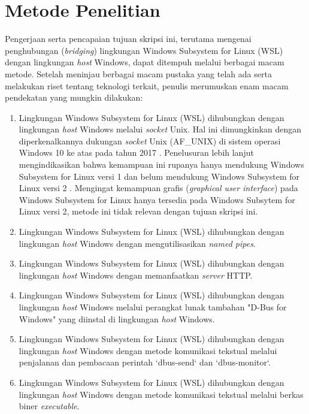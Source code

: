 \chapter{Metode Penelitian}

Pengerjaan serta pencapaian tujuan skripsi ini, terutama mengenai penghubungan (\textit{bridging}) lingkungan Windows Subsystem for Linux (WSL) dengan lingkungan \textit{host} Windows, dapat ditempuh melalui berbagai macam metode. Setelah meninjau berbagai macam pustaka yang telah ada serta melakukan riset tentang teknologi terkait, penulis merumuskan enam macam pendekatan yang mungkin dilakukan:
\begin{enumerate}
    \item Lingkungan Windows Subsystem for Linux (WSL) dihubungkan dengan lingkungan \textit{host} Windows melalui \textit{socket} Unix. Hal ini dimungkinkan dengan diperkenalkannya dukungan \textit{socket} Unix (AF\_UNIX) di sistem operasi Windows 10 ke atas pada tahun 2017 \cite{bringing-afunix-to-windows}. Penelusuran lebih lanjut mengindikasikan bahwa kemampuan ini rupanya hanya mendukung Windows Subsystem for Linux versi 1 dan belum mendukung Windows Subsystem for Linux versi 2 \cite{github-issues-afunix-not-supported-in-wsl2}. Mengingat kemampuan grafis (\textit{graphical user interface}) pada Windows Subsystem for Linux hanya tersedia pada Windows Subsytem for Linux versi 2, metode ini tidak relevan dengan tujuan skripsi ini.
    \item Lingkungan Windows Subsystem for Linux (WSL) dihubungkan dengan lingkungan \textit{host} Windows dengan mengutilisasikan \textit{named pipes}.
    \item Lingkungan Windows Subsystem for Linux (WSL) dihubungkan dengan lingkungan \textit{host} Windows dengan memanfaatkan \textit{server} HTTP.
    \item Lingkungan Windows Subsystem for Linux (WSL) dihubungkan dengan lingkungan \textit{host} Windows melalui perangkat lunak tambahan "D-Bus for Windows" yang diinstal di lingkungan \textit{host} Windows.
    \item Lingkungan Windows Subsystem for Linux (WSL) dihubungkan dengan lingkungan \textit{host} Windows dengan metode komunikasi tekstual melalui penjalanan dan pembacaan perintah `dbus-send` dan `dbus-monitor`.
    \item Lingkungan Windows Subsystem for Linux (WSL) dihubungkan dengan lingkungan \textit{host} Windows dengan metode komunikasi tekstual melalui berkas biner \textit{executable}.
\end{enumerate}


